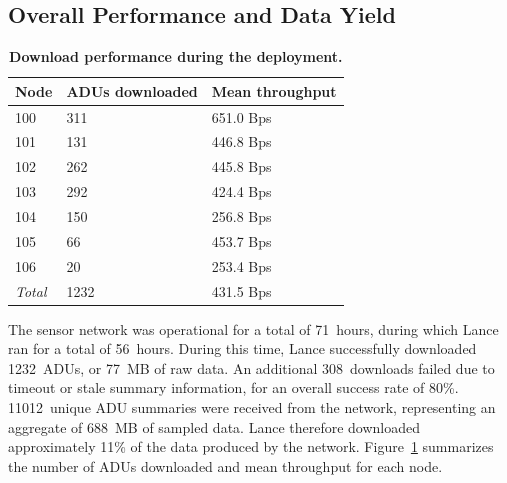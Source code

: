\vfill\eject

\subsection{Overall Performance and Data Yield}

\begin{table}[t]
\begin{center}
\begin{tabular}{|l|l|l|} \hline
\textbf{Node}	& \textbf{ADUs downloaded} & \textbf{Mean throughput} \\ \hline
100 & 311 & 651.0 Bps \\
101 & 131 & 446.8 Bps \\
102 & 262 & 445.8 Bps \\
103 & 292 & 424.4 Bps \\
104 & 150 & 256.8 Bps \\
105 & 66 & 453.7 Bps \\
106 & 20 & 253.4 Bps \\ \hline
\textit{Total} & 1232 & 431.5 Bps \\ \hline
\end{tabular}
\end{center}

\caption{\textbf{Download performance during the deployment.}}

\label{lance-fig-throughput}
\end{table}

The sensor network was operational for a total of 71~hours, during which
Lance ran for a total of 56~hours. During this time, Lance successfully
downloaded 1232~ADUs, or 77~MB of raw data. An additional 308~downloads
failed due to timeout or stale summary information, for an overall success
rate of 80\%. 11012~unique ADU summaries were received from the network,
representing an aggregate of 688~MB of sampled data. Lance therefore
downloaded approximately 11\% of the data produced by the network.
Figure~\ref{lance-fig-throughput} summarizes the number of ADUs downloaded
and mean throughput for each node.

